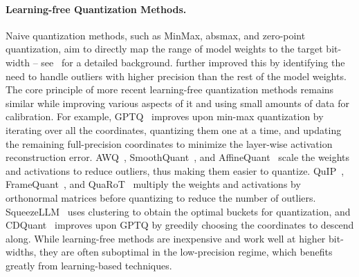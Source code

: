 \paragraph{Learning-free Quantization Methods.} Naive quantization methods, such as MinMax, absmax, and zero-point quantization, aim to directly map the range of model weights to the target bit-width -- see~\citep{dettmers2022gpt3} for a detailed background. \citet{dettmers2022gpt3} further improved this by identifying the need to handle outliers with higher precision than the rest of the model weights. The core principle of more recent learning-free quantization methods remains similar while improving various aspects of it and using small amounts of data for calibration. For example, GPTQ~\citep{frantar2022gptq} improves upon min-max quantization by iterating over all the coordinates, quantizing them one at a time, and updating the remaining full-precision coordinates to minimize the layer-wise activation reconstruction error. AWQ~\citep{lin2023awq}, SmoothQuant~\citep{xiao2023smoothquant}, and AffineQuant~\citep{ma2024affinequant} scale the weights and activations to reduce outliers, thus making them easier to quantize. QuIP~\citep{chee2024quip}, FrameQuant~\citep{adepu2024framequant}, and QuaRoT~\citep{quarot} multiply the weights and activations by orthonormal matrices before quantizing to reduce the number of outliers. SqueezeLLM~\citep{squeezellm} uses clustering to obtain the optimal buckets for quantization, and CDQuant~\citep{DBLP:cdquant} improves upon GPTQ by greedily choosing the coordinates to descend along. While learning-free methods are inexpensive and work well at higher bit-widths, they are often suboptimal in the low-precision regime, which benefits greatly from learning-based techniques.

